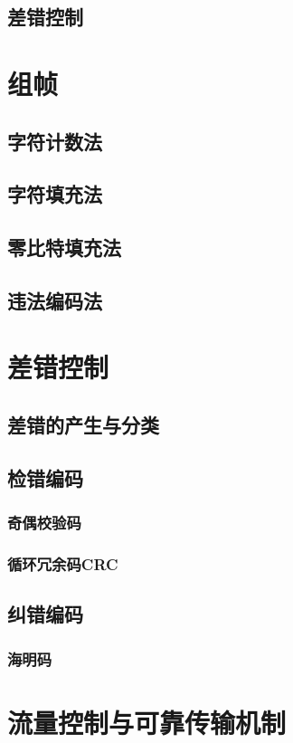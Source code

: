\documentclass[lang=cn,newtx,10pt,scheme=chinese]{../../elegantbook}
\begin{document}
\subsection{差错控制}

\section{组帧}
\subsection{字符计数法}
\subsection{字符填充法}
\subsection{零比特填充法}
\subsection{违法编码法}

\section{差错控制}
\subsection{差错的产生与分类}
\subsection{检错编码}
\subsubsection{奇偶校验码}
\subsubsection{循环冗余码CRC}
\subsection{纠错编码}
\subsubsection{海明码}

\section{流量控制与可靠传输机制}
\end{document}
